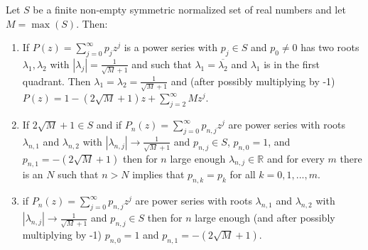 \documentclass[10pt,a4paper]{amsart}
\begin{document}
\begin{lemma}
Let $S$ be a finite non-empty symmetric normalized set of real numbers and let $M = \max(S)$. Then:
\begin{enumerate}
\item If $P(z) = \sum_{j=0}^\infty p_jz^j$ is a power series with $p_j \in S$ and $p_0 \neq 0$ has two roots $\lambda_1, \lambda_2$ with $|\lambda_j| = \frac{1}{\sqrt{M}+1}$ and such that $\lambda_1 = \overline{\lambda_2}$ and $\lambda_1$ is in the first quadrant. Then $\lambda_1 = \lambda_2 = \frac{1}{\sqrt{M}+1}$ and (after possibly multiplying by -1) $P(z) = 1 - (2\sqrt{M}+1)z + \sum_{j=2}^\infty Mz^j$.

\item If $2\sqrt{M} + 1 \in S$ and if $P_n(z) = \sum_{j=0}^\infty p_{n, j}z^j$ are power series with roots $\lambda_{n, 1}$ and $\lambda_{n, 2}$ with $|\lambda_{n, j}| \rightarrow \frac{1}{\sqrt{M}+1}$ and $p_{n, j} \in S$, $p_{n, 0} = 1$, and $p_{n, 1} = -(2\sqrt{M}+1)$ then for $n$ large enough $\lambda_{n, j} \in \mathbb{R}$ and for every $m$ there is an $N$ such that $n > N$ implies that $p_{n, k} = p_k$ for all $k = 0, 1, ..., m$.

\item if $P_n(z) = \sum_{j=0}^\infty p_{n, j}z^j$ are power series with roots $\lambda_{n, 1}$ and $\lambda_{n, 2}$ with $|\lambda_{n, j}| \rightarrow \frac{1}{\sqrt{M}+1}$ and $p_{n, j} \in S$ then for $n$ large enough (and after possibly multiplying by -1) $p_{n, 0} = 1$ and $p_{n, 1} = -(2\sqrt{M}+1)$.
\end{enumerate}
\end{lemma}
\end{document}
